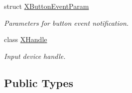 \begin{DoxyCompactItemize}
struct \mbox{\hyperlink{struct_ximmerse_1_1_input_system_1_1_x_device_plugin_1_1_x_button_event_param}{X\+Button\+Event\+Param}}
\begin{DoxyCompactList}\small\item\em Parameters for button event notification. \end{DoxyCompactList}\item 
class \mbox{\hyperlink{class_ximmerse_1_1_input_system_1_1_x_device_plugin_1_1_x_handle}{X\+Handle}}
\begin{DoxyCompactList}\small\item\em Input device handle. \end{DoxyCompactList}\end{DoxyCompactItemize}
\subsection*{Public Types}
